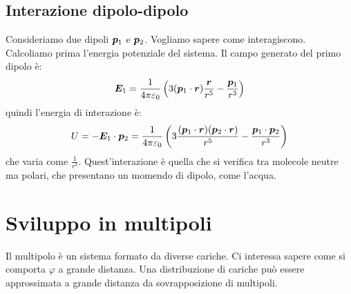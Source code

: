 \subsection{Interazione dipolo-dipolo}
Consideriamo due dipoli $\boldsymbol{p}_1$ e $\boldsymbol{p}_2$. Vogliamo sapere come interagiscono. Calcoliamo prima l'energia potenziale del sistema. Il campo generato del primo dipolo è:
\[
  \boldsymbol{E}_1 = \frac{1}{4\pi\varepsilon_0}\left(3(\boldsymbol{p}_1\cdot \boldsymbol{r})\frac{\boldsymbol{r}}{r^5}-\frac{\boldsymbol{p}_1}{r^3}\right)
\]
quindi l'energia di interazione è:
\[
  U = -\boldsymbol{E}_1\cdot \boldsymbol{p}_2 = \frac{1}{4\pi\varepsilon_0}\left(3\frac{(\boldsymbol{p}_1\cdot \boldsymbol{r})(\boldsymbol{p}_2\cdot \boldsymbol{r})}{r^5}-\frac{\boldsymbol{p}_1\cdot\boldsymbol{p}_2}{r^3}\right)
\]
che varia come $\frac{1}{r^3}$. Quest'interazione è quella che si verifica tra molecole neutre ma polari, che presentano un momendo di dipolo, come l'acqua.
\section{Sviluppo in multipoli}
Il multipolo è un sistema formato da diverse cariche. Ci interessa sapere come si comporta $\varphi$ a grande distanza. Una distribuzione di cariche può essere approssimata a grande distanza da sovrapposizione di multipoli.
